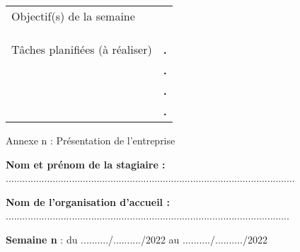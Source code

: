 \documentclass[a4paper,11pt]{article}
\makeatletter
\newcommand{\mktitle}{\@maketitle}
\makeatother
\begin{document}
\begin{center}
\begin{tabular}{|C{6cm}|p{10.3cm}|}
	\hline
	\\
	\hline
	Objectif(s) de la semaine &\\&\\&\\&\\
	\hline
	Tâches planifiées (à réaliser) & \hspace{.2cm}\huge\textbf{.}\\&\hspace{.2cm}\huge\textbf{.}\\&\hspace{.2cm}\huge\textbf{.}\\& \hspace{.2cm}\huge\textbf{.}\\
	\hline
\end{tabular}
\end{center}\newpage

\begin{center}\LARGE Annexe n : Présentation de l'entreprise\end{center}
\newpage

\mktitle\vspace{-.2cm}

\noindent\textbf{Nom et prénom de la stagiaire :} .........................................................................................................\vspace{.4cm}

\noindent\textbf{Nom de l'organisation d'accueil :} .......................................................................................................\vspace{.4cm}

\noindent\textbf{Semaine n} : du ........../........../2022 au ........../........../2022\vspace{-.2cm}
\end{document}
